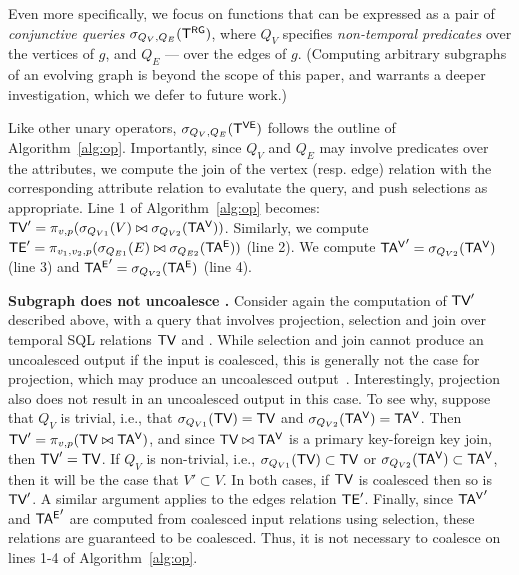   Even more
specifically, we focus on functions that can be expressed as a pair of
{\em conjunctive queries} $\sigma_{Q_V,Q_E} (\mathsf{T^{RG}})$, where $Q_V$
specifies {\em non-temporal predicates} over the vertices of $g$, and
$Q_E$ --- over the edges of $g$. (Computing arbitrary subgraphs of an
evolving graph is beyond the scope of this paper, and warrants a
deeper investigation, which we defer to future work.)

Like other unary operators, $\sigma_{Q_V, Q_E} (\mathsf{T^{VE}})$ follows the
outline of Algorithm~\ref{alg:op}.  Importantly, since $Q_V$ and $Q_E$
may involve predicates over the attributes, we compute the join of the
vertex (resp. edge) relation with the corresponding attribute relation
to evalutate the query, and push selections as appropriate.  Line 1 of
Algorithm~\ref{alg:op} becomes: $\textsf{TV}' = \pi_{v,p} (\sigma_{Q_{V1}} (V)
\bowtie \sigma_{Q_{V2}} (\mathsf{TA^{V}}))$.  Similarly, we compute $\textsf{TE}' =
\pi_{v_1,v_2,p} (\sigma_{Q_{E1}} (E) \bowtie \sigma_{Q_{E2}} (\mathsf{TA^{E}}))$
(line 2).  We compute $\mathsf{TA^{V}}' = \sigma_{Q_{V2}} (\mathsf{TA^{V}})$ (line 3) and
$\mathsf{TA^{E}}' = \sigma_{Q_{V2}} (\mathsf{TA^{E}})$ (line 4).

{\bf Subgraph does not uncoalesce \tve.}  Consider again the
computation of $\textsf{TV}'$ described above, with a query that involves
projection, selection and join over temporal SQL relations $\textsf{TV}$ and
\tav.  While selection and join cannot produce an uncoalesced output
if the input is coalesced, this is generally not the case for
projection, which may produce an uncoalesced
output~\cite{DBLP:conf/vldb/BohlenSS96}.  Interestingly, projection
also does not result in an uncoalesced output in this case. To see
why, suppose that $Q_V$ is trivial, i.e., that $\sigma_{Q_{V1}} (\textsf{TV})
= \textsf{TV}$ and $\sigma_{Q_{V2}} (\mathsf{TA^{V}}) = \mathsf{TA^{V}}$. Then $\textsf{TV}' = \pi_{v,p}
(\textsf{TV} \bowtie \mathsf{TA^{V}})$, and since $\textsf{TV} \bowtie \mathsf{TA^{V}}$ is a primary
key-foreign key join, then $\textsf{TV}' = \textsf{TV}$.  If $Q_V$ is non-trivial,
i.e., $\sigma_{Q_{V1}} (\textsf{TV}) \subset \textsf{TV}$ or $\sigma_{Q_{V2}} (\mathsf{TA^{V}})
\subset \mathsf{TA^{V}}$, then it will be the case that $V' \subset V$.  In both
cases, if $\textsf{TV}$ is coalesced then so is $\textsf{TV}'$.  A similar argument
applies to the edges relation $\textsf{TE}'$.  Finally, since $\mathsf{TA^{V}}'$ and
$\mathsf{TA^{E}}'$ are computed from coalesced input relations using selection,
these relations are guaranteed to be coalesced.  Thus, it is not
necessary to coalesce on lines 1-4 of Algorithm~\ref{alg:op}.

